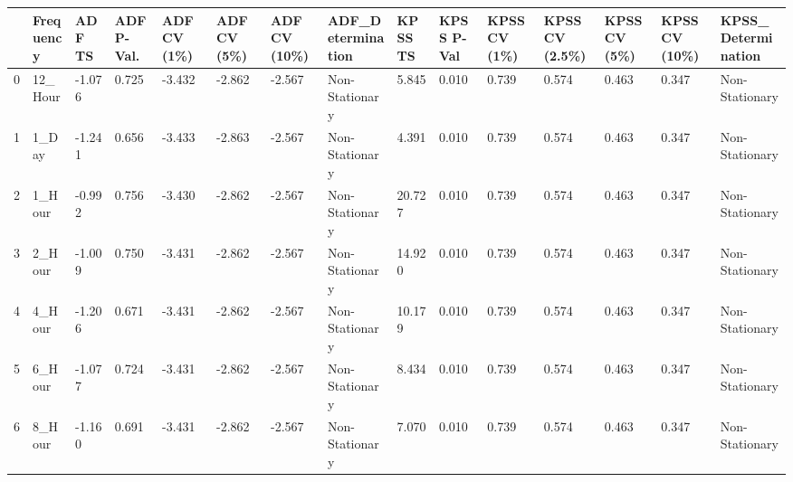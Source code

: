 \begin{tabular}{lllllllllllllll}
\toprule
 & Frequency & ADF TS & ADF P-Val. & ADF CV (1\%) & ADF CV (5\%) & ADF CV (10\%) & ADF_Determination & KPSS TS & KPSS P-Val & KPSS CV (1\%) & KPSS CV (2.5\%) & KPSS CV (5\%) & KPSS CV (10\%) & KPSS_Determination \\
\midrule
0 & 12_Hour & -1.076 & 0.725 & -3.432 & -2.862 & -2.567 & Non-Stationary & 5.845 & 0.010 & 0.739 & 0.574 & 0.463 & 0.347 & Non-Stationary \\
1 & 1_Day & -1.241 & 0.656 & -3.433 & -2.863 & -2.567 & Non-Stationary & 4.391 & 0.010 & 0.739 & 0.574 & 0.463 & 0.347 & Non-Stationary \\
2 & 1_Hour & -0.992 & 0.756 & -3.430 & -2.862 & -2.567 & Non-Stationary & 20.727 & 0.010 & 0.739 & 0.574 & 0.463 & 0.347 & Non-Stationary \\
3 & 2_Hour & -1.009 & 0.750 & -3.431 & -2.862 & -2.567 & Non-Stationary & 14.920 & 0.010 & 0.739 & 0.574 & 0.463 & 0.347 & Non-Stationary \\
4 & 4_Hour & -1.206 & 0.671 & -3.431 & -2.862 & -2.567 & Non-Stationary & 10.179 & 0.010 & 0.739 & 0.574 & 0.463 & 0.347 & Non-Stationary \\
5 & 6_Hour & -1.077 & 0.724 & -3.431 & -2.862 & -2.567 & Non-Stationary & 8.434 & 0.010 & 0.739 & 0.574 & 0.463 & 0.347 & Non-Stationary \\
6 & 8_Hour & -1.160 & 0.691 & -3.431 & -2.862 & -2.567 & Non-Stationary & 7.070 & 0.010 & 0.739 & 0.574 & 0.463 & 0.347 & Non-Stationary \\
\bottomrule
\end{tabular}
